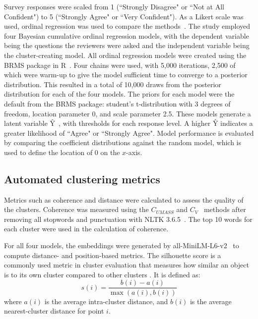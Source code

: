 \documentclass{article}
\begin{document}
Survey responses were scaled from 1 (``Strongly Disagree" or ``Not at All Confident") to 5 (``Strongly Agree" or ``Very Confident"). As a Likert scale was used, ordinal regression was used to compare the methods~\cite{burkner2019}.
The study employed four Bayesian cumulative ordinal regression models, with the dependent variable being the questions the reviewers were asked and the independent variable being the cluster-creating model. All ordinal regression models were created using the BRMS package in R~\cite{brms2021}. Four chains were used, with 5,000 iterations, 2,500 of which were warm-up to give the model sufficient time to converge to a posterior distribution. This resulted in a total of 10,000 draws from the posterior distribution for each of the four models. The priors for each model were the default from the BRMS package: student's t-distribution with 3 degrees of freedom, location parameter 0, and scale parameter 2.5. These models generate a latent variable \^{Y}~\cite{burkner2019}, with thresholds for each response level. A higher \^{Y} indicates a greater likelihood of ``Agree" or ``Strongly Agree". Model performance is evaluated by comparing the coefficient distributions against the random model, which is used to define the location of 0 on the $x$-axis.

\subsection{Automated clustering metrics}



Metrics such as coherence and distance were calculated to assess the quality of the clusters.
Coherence was measured using the $C_{UMASS}$ and $C_V$~\cite{rehurek2011gensim} methods after removing all stopwords and punctuation with NLTK 3.6.5~\cite{loper2002nltk}. The top 10 words for each cluster were used in the calculation of coherence.



For all four models, the embeddings were generated by all-MiniLM-L6-v2~\cite{wang2020minilm, reimers-2019-sentence-bert} to compute distance- and position-based metrics. The silhouette score is a commonly used metric in cluster evaluation that measures how similar an object is to its own cluster compared to other clusters \cite{9260048}. It is defined as:
\begin{equation}
\label{eq:silhouette}
{s(i) = \frac{b(i) - a(i)}{\max(a(i), b(i))}}    
\end{equation}
where \(a(i)\) is the average intra-cluster distance, and \(b(i)\) is the average nearest-cluster distance for point \(i\).
\end{document}

